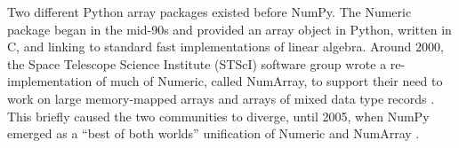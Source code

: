 Two different Python array packages existed before NumPy.
The Numeric package began in the mid-90s and provided an array object in
Python, written in C, and linking to standard fast implementations of linear
algebra.
Around 2000, the Space Telescope Science Institute (STScI) software group wrote
a re-implementation of much of Numeric, called NumArray, to support their
need to work on large memory-mapped arrays and arrays of mixed data type
records \cite{STScI-slither}.
This briefly caused the two communities to diverge, until
2005, when NumPy emerged as a ``best of both worlds'' unification of Numeric
and NumArray \cite{oliphant2006guide}.

%
%

